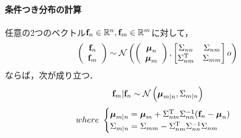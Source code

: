 \documentclass[11pt,a4j]{article}
\begin{document}
      \paragraph{条件つき分布の計算}
      任意の2つのベクトル${\bf f}_n \in \mathbb{R}^{n}, {\bf f}_m \in \mathbb{R}^{m}$に対して，
      \begin{align}
        \left(
          \begin{array}{c}
            {\bf f}_n \\ {\bf f}_m
          \end{array}
        \right)
        \sim
        \mathcal{N} 
        \left(
          \left(
            \begin{array}{c}
              {\boldsymbol \mu}_n \\ {\boldsymbol \mu}_m
            \end{array}
          \right)
          ,
          \begin{bmatrix}
            \Sigma_{nn} & \Sigma_{nm} \\
            \Sigma_{nm}^{\mathrm{T}} & \Sigma_{mm}
          \end{bmatrix}o
        \right)
      \end{align}
      ならば，次が成り立つ．
      \begin{align}
        {\bf f}_m | {\bf f}_n \sim \mathcal{N}\left( {\boldsymbol \mu}_{m|n}, \Sigma_{m|n} \right) \label{form:gaussian_conditional}  
      \end{align}
      \begin{align}          
        where ~ 
        \begin{cases}
          {\boldsymbol \mu}_{m|n} = {\boldsymbol \mu}_{m} + \Sigma_{nm}^{\mathrm{T}} \Sigma_{nn}^{-1} ( {\bf f}_n - {\boldsymbol \mu}_{n} ) \\
          \Sigma_{m|n} = \Sigma_{mm} - \Sigma_{nm}^{\mathrm{T}} \Sigma_{nn}^{-1} \Sigma_{nm}
        \end{cases} \nonumber
      \end{align}
\end{document}
